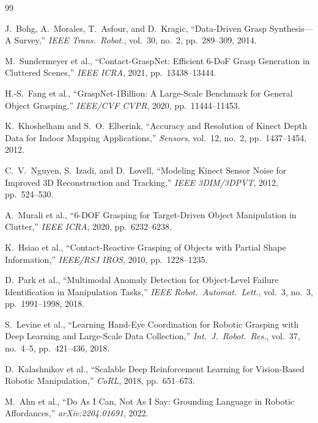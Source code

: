 \documentclass[11pt,a4paper]{report}
\begin{document}
\begin{thebibliography}{99}

J.~Bohg, A.~Morales, T.~Asfour, and D.~Kragic,
``Data-Driven Grasp Synthesis---A Survey,''
\emph{IEEE Trans.\ Robot.}, vol.~30, no.~2, pp.~289--309, 2014.

M.~Sundermeyer et al., ``Contact-GraspNet: Efficient 6-DoF Grasp
Generation in Cluttered Scenes,'' \emph{IEEE ICRA}, 2021,
pp.~13438--13444.

H.-S.~Fang et al., ``GraspNet-1Billion: A Large-Scale Benchmark for
General Object Grasping,'' \emph{IEEE/CVF CVPR}, 2020,
pp.~11444--11453.

K.~Khoshelham and S.~O.~Elberink,
``Accuracy and Resolution of Kinect Depth Data for Indoor Mapping
Applications,''
\emph{Sensors}, vol.~12, no.~2, pp.~1437--1454, 2012.

C.~V.~Nguyen, S.~Izadi, and D.~Lovell,
``Modeling Kinect Sensor Noise for Improved 3D Reconstruction and
Tracking,'' \emph{IEEE 3DIM/3DPVT}, 2012, pp.~524--530.

A.~Murali et al., ``6-DOF Grasping for Target-Driven Object
Manipulation in Clutter,'' \emph{IEEE ICRA}, 2020, pp.~6232--6238.

K.~Hsiao et al., ``Contact-Reactive Grasping of Objects with Partial
Shape Information,'' \emph{IEEE/RSJ IROS}, 2010, pp.~1228--1235.

D.~Park et al., ``Multimodal Anomaly Detection for Object-Level
Failure Identification in Manipulation Tasks,''
\emph{IEEE Robot.\ Automat.\ Lett.}, vol.~3, no.~3,
pp.~1991--1998, 2018.

S.~Levine et al., ``Learning Hand-Eye Coordination for Robotic
Grasping with Deep Learning and Large-Scale Data Collection,''
\emph{Int.\ J.\ Robot.\ Res.}, vol.~37, no.~4--5,
pp.~421--436, 2018.

D.~Kalashnikov et al., ``Scalable Deep Reinforcement Learning for
Vision-Based Robotic Manipulation,'' \emph{CoRL}, 2018,
pp.~651--673.

M.~Ahn et al., ``Do As I Can, Not As I Say: Grounding Language in
Robotic Affordances,'' \emph{arXiv:2204.01691}, 2022.


\end{thebibliography}
\end{document}
